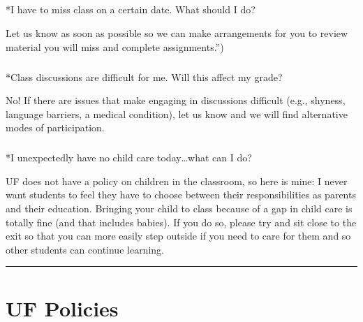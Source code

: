 \documentclass[
  10pt,
  letterpaper,
  oneside,
  open=any]{scrbook}
\makeatletter
\let\oldparagraph\paragraph
\renewcommand{\paragraph}{
    \@ifstar
      \xxxParagraphStar
      \xxxParagraphNoStar
  }
\newcommand{\xxxParagraphStar}[1]{\oldparagraph*{#1}\mbox{}}
\newcommand{\xxxParagraphNoStar}[1]{\oldparagraph{#1}\mbox{}}
\makeatother
\begin{document}
\paragraph*{I have to miss class on a certain date. What should I
do?}\label{i-have-to-miss-class-on-a-certain-date.-what-should-i-do}

Let us know as soon as possible so we can make arrangements for you to
review material you will miss and complete assignments.'')

\paragraph*{Class discussions are difficult for me. Will this affect my
grade?}\label{class-discussions-are-difficult-for-me.-will-this-affect-my-grade}

No! If there are issues that make engaging in discussions difficult
(e.g., shyness, language barriers, a medical condition), let us know and
we will find alternative modes of participation.

\paragraph*{I unexpectedly have no child care today\ldots what can I
do?}\label{i-unexpectedly-have-no-child-care-todaywhat-can-i-do}

UF does not have a policy on children in the classroom, so here is mine:
I never want students to feel they have to choose between their
responsibilities as parents and their education. Bringing your child to
class because of a gap in child care is totally fine (and that includes
babies). If you do so, please try and sit close to the exit so that you
can more easily step outside if you need to care for them and so other
students can continue learning.

\begin{center}\rule{0.5\linewidth}{0.5pt}\end{center}


\chapter{UF Policies}\label{uf-policies}
\end{document}
